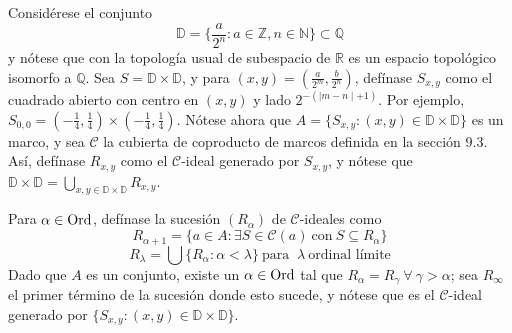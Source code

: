 \begin{exa}
Considérese el conjunto 
$$\mathbb{D}=\{\frac{a}{2^n}:a\in\mathbb{Z},n\in\mathbb{N}\}\subset\mathbb{Q}$$
y nótese que con la topología usual de subespacio de $\mathbb{R}$ es un espacio topológico isomorfo a $\mathbb{Q}$. Sea $S=\mathbb{D}\times\mathbb{D}$, y para $(x,y)=(\frac{a}{2^m},\frac{b}{2^n})$, defínase $S_{x,y}$ como el cuadrado abierto con centro en $(x,y)$ y lado $2^{-(\mid m-n\mid+1)}$. Por ejemplo, $S_{0,0}=(-\tfrac{1}{4},\tfrac{1}{4})\times (-\tfrac{1}{4},\tfrac{1}{4})$.
Nótese ahora que $A=\{S_{x,y}:(x,y)\in\mathbb{D}\times\mathbb{D}\}$ es un marco, y sea $\mathcal{C}$ la cubierta de coproducto de marcos definida en la sección 9.3. Así, defínase $R_{x,y}$ como el $\mathcal{C}$-ideal generado por $S_{x,y}$, y nótese que $\mathbb{D}\times\mathbb{D}=\bigcup\limits_{x,y\in\mathbb{D}\times\mathbb{D}}R_{x,y}$.

Para $\alpha\in\mathrm{Ord}$, defínase la sucesión $(R_\alpha)$ de $\mathcal{C}$-ideales como 
$$R_{\alpha+1}=\{a\in A : \exists S\in \mathcal{C}(a) \ \text{con} \ S\subseteq R_\alpha\}$$
$$ R_\lambda =\bigcup\{R_\alpha : \alpha<\lambda\} \ \text{para } \ \lambda \ \text{ordinal límite}$$
Dado que $A$ es un conjunto, existe un $\alpha\in\mathrm{Ord}$ tal que $R_\alpha=R_\gamma \ \forall \ \gamma>\alpha$; sea $R_\infty$ el primer término de la sucesión donde esto sucede, y nótese que es el $\mathcal{C}$-ideal generado por $\{S_{x,y}:(x,y)\in\mathbb{D}\times\mathbb{D}\}$.


\end{exa}
